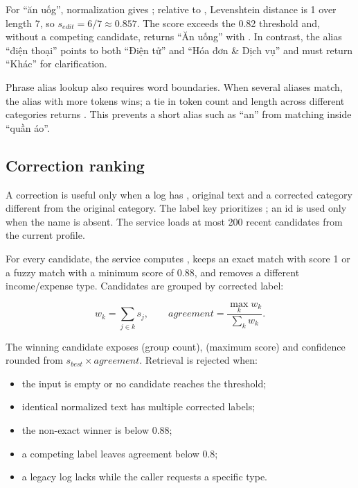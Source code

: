 For ``ăn uốg'', normalization gives ; relative to , Levenshtein distance is 1 over length 7, so $s_{edit}=6/7\approx0.857$. The score exceeds the 0.82 threshold and, without a competing candidate, returns ``Ăn uống'' with . In contrast, the alias ``điện thoại'' points to both ``Điện tử'' and ``Hóa đơn \& Dịch vụ'' and must return ``Khác'' for clarification.

Phrase alias lookup also requires word boundaries. When several aliases match, the alias with more tokens wins; a tie in token count and length across different categories returns . This prevents a short alias such as ``an'' from matching inside ``quần áo''.

\subsection{Correction ranking}

A correction is useful only when a log has , original text and a corrected category different from the original category. The label key prioritizes ; an id is used only when the name is absent. The service loads at most 200 recent candidates from the current profile.

For every candidate, the service computes , keeps an exact match with score 1 or a fuzzy match with a minimum score of 0.88, and removes a different income/expense type. Candidates are grouped by corrected label:

\begin{equation}
  w_k=\sum_{j\in k}s_j,\qquad
  agreement=\frac{\max_k w_k}{\sum_k w_k}.
\end{equation}

The winning candidate exposes  (group count),  (maximum score) and confidence rounded from $s_{best}\times agreement$. Retrieval is rejected when:

\begin{itemize}
  \item the input is empty or no candidate reaches the threshold;
  \item identical normalized text has multiple corrected labels;
  \item the non-exact winner is below 0.88;
  \item a competing label leaves agreement below 0.8;
  \item a legacy log lacks  while the caller requests a specific type.
\end{itemize}

